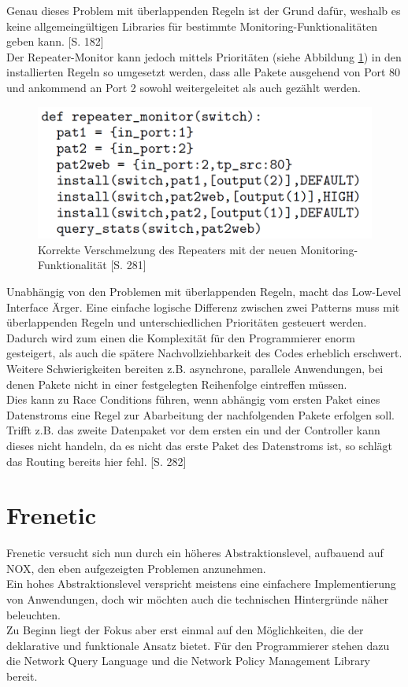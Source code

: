 \documentclass[10pt,conference]{IEEEtran}
\begin{document}
Genau dieses Problem mit überlappenden Regeln ist der Grund dafür, weshalb es keine allgemeingültigen Libraries für bestimmte Monitoring-Funktionalitäten geben kann. \cite{4}[S. 182]\\
Der Repeater-Monitor kann jedoch mittels Prioritäten (siehe Abbildung \ref{fig:NOXRepeaterMonitoring}) in den installierten Regeln so umgesetzt werden, dass alle Pakete ausgehend von Port 80 und ankommend an Port 2 sowohl weitergeleitet als auch gezählt werden.
\begin{figure}[h]
	\centering
	\includegraphics[width=\columnwidth]{images/NOXRepeaterMonitoring.PNG}
	\caption{Korrekte Verschmelzung des Repeaters mit der neuen Monitoring-Funktionalität \cite{4}[S. 281]}
	\label{fig:NOXRepeaterMonitoring}
\end{figure}
\newline
Unabhängig von den Problemen mit überlappenden Regeln, macht das Low-Level Interface Ärger. Eine einfache logische Differenz zwischen zwei Patterns muss mit überlappenden Regeln und unterschiedlichen Prioritäten gesteuert werden. Dadurch wird zum einen die Komplexität für den Programmierer enorm gesteigert, als auch die spätere Nachvollziehbarkeit des Codes erheblich erschwert.\\
Weitere Schwierigkeiten bereiten z.B. asynchrone, parallele Anwendungen, bei denen Pakete nicht in einer festgelegten Reihenfolge eintreffen müssen.\\
Dies kann zu Race Conditions führen, wenn abhängig vom ersten Paket eines Datenstroms eine Regel zur Abarbeitung der nachfolgenden Pakete erfolgen soll. Trifft z.B. das zweite Datenpaket vor dem ersten ein und der Controller kann dieses nicht handeln, da es nicht das erste Paket des Datenstroms ist, so schlägt das Routing bereits hier fehl. \cite{4}[S. 282]

\section{Frenetic}
Frenetic versucht sich nun durch ein höheres Abstraktionslevel, aufbauend auf NOX, den eben aufgezeigten Problemen anzunehmen. \cite{4}\\
Ein hohes Abstraktionslevel verspricht meistens eine einfachere Implementierung von Anwendungen, doch wir möchten auch die technischen Hintergründe näher beleuchten.\\
Zu Beginn liegt der Fokus aber erst einmal auf den Möglichkeiten, die der deklarative und funktionale Ansatz bietet. Für den Programmierer stehen dazu die Network Query Language und die Network Policy Management Library bereit. \cite{3,4}
\end{document}

